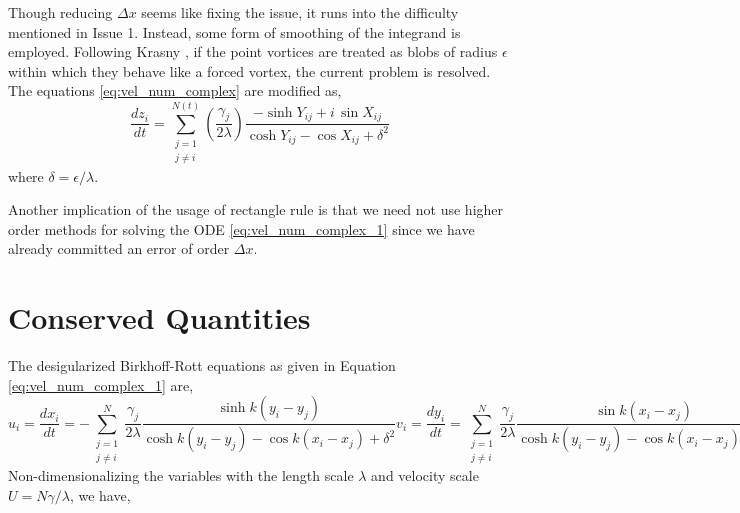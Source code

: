 \documentclass{article}
\begin{document}
Though reducing $\Delta x$ seems like fixing the issue, it runs into the difficulty mentioned in Issue 1. Instead, some form of smoothing of the integrand is employed. Following Krasny \cite{Krasny}, if the point vortices are treated as blobs of radius $\epsilon$ within which they behave like a forced vortex, the current problem is resolved. The equations \eqref{eq:vel_num_complex} are modified as,
\begin{equation}\label{eq:vel_num_complex_1}
\frac{dz_i}{dt}=\sum\limits_{\substack{j=1 \\ j\neq i}}^{N(t)}\left(\frac{\gamma_j}{2\lambda}\right)
\frac{-\sinh{Y_{ij}}+i\, \sin{X_{ij}}}{\cosh{Y_{ij}}-\cos{X_{ij}}+\delta ^2}
\end{equation}
where $\delta = \epsilon / \lambda$.

Another implication of the usage of rectangle rule is that we need not use higher order methods for solving the ODE \eqref{eq:vel_num_complex_1} since we have already committed an error of order $\Delta x$.

\section{Conserved Quantities}
The desigularized Birkhoff-Rott equations as given in Equation \eqref{eq:vel_num_complex_1} are,
\begin{subequations}
\begin{equation*}
u_i= \frac{dx_i}{dt}=-\sum_{\substack{j=1 \\ j\neq i}}^{N} \frac{\gamma_j}{2\lambda} \frac{\sinh k(y_i-y_j)}{\cosh k(y_i-y_j)-\cos k(x_i-x_j)+\delta^2}
\end{equation*}
\begin{equation*}
v_i= \frac{dy_i}{dt}= \sum_{\substack{j=1 \\ j\neq i}}^{N} \frac{\gamma_j}{2\lambda} \frac{\sin k(x_i-x_j)}{\cosh k(y_i-y_j)-\cos k(x_i-x_j)+\delta^2}
\end{equation*}
\end{subequations}
Non-dimensionalizing the variables with the length scale $\lambda$ and velocity scale $U=N\gamma/\lambda$, we have,
\end{document}

